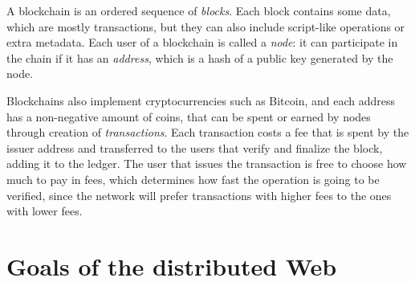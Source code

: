 \documentclass[mscthesis]{usiinfthesis}
\begin{document}
A blockchain is an ordered sequence of \emph{blocks}. Each block contains some data, which are mostly transactions, but they can also include script-like operations or extra metadata. Each user of a blockchain is called a \emph{node}: it can participate in the chain if it has an \emph{address}, which is a hash of a public key generated by the node.

Blockchains also implement cryptocurrencies such as Bitcoin, and each address has a non-negative amount of coins, that can be spent or earned by nodes through creation of \emph{transactions}. Each transaction costs a fee that is spent by the issuer address and transferred to the users that verify and finalize the block, adding it to the ledger. The user that issues the transaction is free to choose how much to pay in fees, which determines how fast the operation is going to be verified, since the network will prefer transactions with higher fees to the ones with lower fees.

\section{Goals of the distributed Web}\label{sec:goals}
\end{document}
